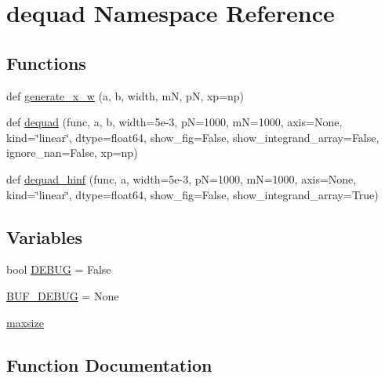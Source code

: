 \hypertarget{namespacedequad}{}\section{dequad Namespace Reference}
\label{namespacedequad}
\subsection*{Functions}
\begin{DoxyCompactItemize}
\item 
def \hyperlink{namespacedequad_a0774348e796cb0945f2e0b0a7fa1c1e9}{generate\+\_\+x\+\_\+w} (a, b, width, mN, pN, xp=np)
\item 
def \hyperlink{namespacedequad_a312cb2f278bec2760a7cb9a17bf3928f}{dequad} (func, a, b, width=5e-\/3, p\+N=1000, m\+N=1000, axis=\+None, kind=\char`\"{}linear\char`\"{}, dtype=float64, show\+\_\+fig=\+False, show\+\_\+integrand\+\_\+array=\+False, ignore\+\_\+nan=\+False, xp=np)
\item 
def \hyperlink{namespacedequad_a2654bb61f33ab8685320882396c81ae0}{dequad\+\_\+hinf} (func, a, width=5e-\/3, p\+N=1000, m\+N=1000, axis=\+None, kind=\char`\"{}linear\char`\"{}, dtype=float64, show\+\_\+fig=\+False, show\+\_\+integrand\+\_\+array=\+True)
\end{DoxyCompactItemize}
\subsection*{Variables}
\begin{DoxyCompactItemize}
\item 
bool \hyperlink{namespacedequad_a19fc97d6e01fffb74ca81c02a51d86c0}{D\+E\+B\+UG} = False
\item 
\hyperlink{namespacedequad_a7f2d7b33e38c6d5249b152740f656344}{B\+U\+F\+\_\+\+D\+E\+B\+UG} = None
\item 
\hyperlink{namespacedequad_aecd7501e851b01ca793cb5b896fa5141}{maxsize}
\end{DoxyCompactItemize}


\subsection{Function Documentation}
\mbox{\label{namespacedequad_a312cb2f278bec2760a7cb9a17bf3928f}} 
